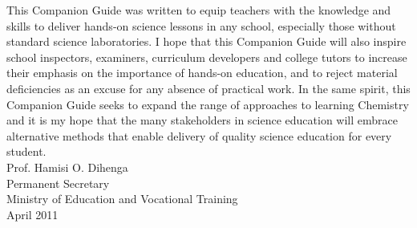 This Companion Guide was written to equip teachers with the knowledge and skills to deliver hands-on science lessons in any school, especially those without standard science laboratories. I hope that this Companion Guide will also inspire school inspectors, examiners, curriculum developers and college tutors to increase their emphasis on the importance of hands-on education, and to reject material deficiencies as an excuse for any absence of practical work. In the same spirit, this Companion Guide seeks to expand the range of approaches to learning Chemistry and it is my hope that the many stakeholders in science education will embrace alternative methods that enable delivery of quality science education for every student.\\[80pt]
Prof. Hamisi O. Dihenga\\
Permanent Secretary\\
Ministry of Education and Vocational Training\\
April 2011
